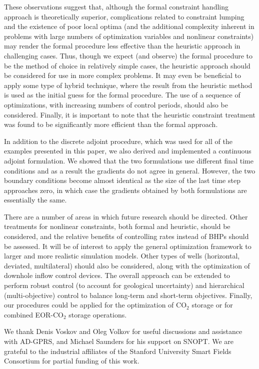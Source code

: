 \documentclass[twocolumn,numbook]{svjour3}          %
\begin{document}
These observations suggest that, although the formal constraint handling approach is theoretically superior, complications related to constraint lumping and the existence of poor local optima (and the additional complexity inherent in problems with large numbers of optimization variables and nonlinear constraints) may render the formal procedure less effective than the heuristic approach in challenging cases. Thus, though we expect (and observe) the formal procedure to be the method of choice in relatively simple cases, the heuristic approach should be considered for use in more complex problems. It may even be beneficial to apply some type of hybrid technique, where the result from the heuristic method is used as the initial guess for the formal procedure. The use of a sequence of optimizations, with increasing numbers of control periods, should also be considered. Finally, it is important to note that the heuristic constraint treatment was found to be significantly more efficient than the formal approach. 


In addition to the discrete adjoint procedure, which was used for all of the
examples presented in this paper, we also derived and implemented a continuous
adjoint formulation. We showed that the two formulations use different
final time conditions and as a result the gradients do not
agree in general. However, the two boundary conditions become almost identical as the
size of the last time step approaches zero, in which case the gradients obtained by
both formulations are essentially the same.

There are a number of areas in which future research should be directed. Other
treatments for nonlinear constraints, both formal and heuristic, should be
considered, and the relative benefits of controlling rates instead of BHPs
should be assessed. It will be of interest to apply the general optimization
framework to larger and more realistic simulation models. Other types of wells
(horizontal, deviated, multilateral) should also be considered, along with the
optimization of downhole inflow control devices. The overall approach can be 
extended to perform robust control (to account for geological uncertainty) and hierarchical
(multi-objective) control to balance long-term and short-term objectives. Finally, our procedures could be applied for the optimization of CO$_2$ storage or for combined
EOR-CO$_2$ storage operations.



\begin{acknowledgements} 
We thank Denis Voskov and Oleg Volkov for useful discussions and assistance with AD-GPRS, and
Michael Saunders for his support 
on SNOPT. We are grateful
to the industrial affiliates of the Stanford University Smart Fields Consortium for partial
funding of this work.
\end{acknowledgements}




\end{document}
